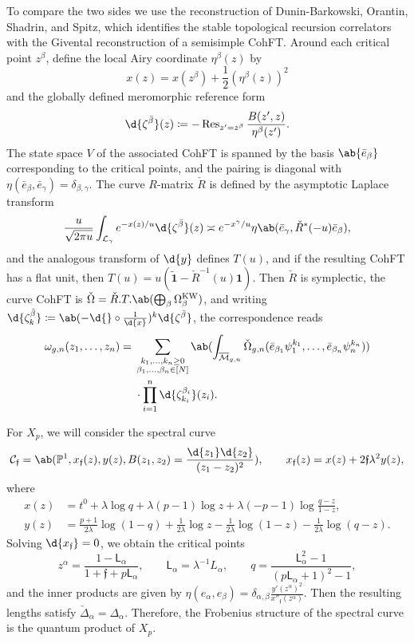 \documentclass{amsart}
\theoremstyle{definition}
\theoremstyle{remark}
\theoremstyle{plain}
\theoremstyle{definition}
\theoremstyle{remark}
\renewcommand{\P}{\mathbb{P}}
\newcommand{\Mbar}{\overline{\mathcal{M}}}
\newcommand{\mc}[1]{\mathcal{#1}}
\newcommand{\mf}[1]{\mathfrak{#1}}
\newcommand{\mr}[1]{\mathrm{#1}}
\newcommand{\on}[1]{\operatorname{#1}}
\newcommand{\ms}[1]{\mathsf{#1}}
\newcommand{\wt}[1]{\widetilde{#1}}
\newcommand{\1}{\mathbf{1}}
\newcommand{\2}{\mathbf{2}}
\newcommand{\3}{\mathbf{3}}
\begin{document}
To compare the two sides we use the reconstruction of Dunin-Barkowski, Orantin, Shadrin, and Spitz, which identifies the stable topological recursion correlators with the Givental reconstruction of a semisimple CohFT. Around each critical point \(z^{\beta}\), define the local Airy coordinate \(\eta^{\beta}(z)\) by
\[ x(z) = x(z^{\beta}) + \frac{1}{2}(\eta^{\beta}(z))^2 \]
and the globally defined meromorphic reference form
\[ \d{\zeta^{\bar{\beta}}}(z) \coloneqq -\on{Res}_{z'=z^{\beta}}\frac{B(z',z)}{\eta^{\beta}(z')}. \]
The state space \(V\) of the associated CohFT is spanned by the basis \(\ab\{\bar{e}_{\beta}\}\) corresponding to the critical points, and the pairing is diagonal with \(\eta(\bar{e}_{\beta},\bar{e}_{\gamma}) = \delta_{\beta,\gamma}\). The curve \(R\)-matrix \(\check{R}\) is defined by the asymptotic Laplace transform
\[ \frac{u}{\sqrt{2\pi u}}\int_{\mc{L}_{\gamma}} e^{-x(z)/u}\d{\zeta^{\bar{\beta}}}(z) \asymp e^{-x^{\gamma}/u}\eta\ab(\bar{e}_{\gamma}, \check{R}^*(-u)\bar{e}_{\beta}), \]
and the analogous transform of \(\d{y}\) defines \(T(u)\), and if the resulting CohFT has a flat unit, then \(T(u) = u(\wt{\1}-\check{R}^{-1}(u)\1)\). Then \(\check{R}\) is symplectic, the curve CohFT is \(\check{\Omega} = \check{R}.T.\ab(\bigoplus_{\beta}\Omega^{\mr{KW}}_{\beta})\), and writing \(\d{\zeta^{\bar{\beta}}_k} \coloneqq \ab(-\d{} \circ \frac{1}{\d{x}})^k \d{\zeta^{\bar{\beta}}}\), the correspondence reads
\begin{align*}
    \omega_{g,n}(z_1,\ldots,z_n) ={}& \sum_{\substack{k_1,\ldots,k_n \geq 0 \\ \beta_1,\ldots,\beta_n \in [N]}}\ab(\int_{\Mbar_{g,n}} \check{\Omega}_{g,n}(\bar{e}_{\beta_1}\psi_1^{k_1},\ldots,\bar{e}_{\beta_n}\psi_n^{k_n})) \\
    &\cdot \prod_{i=1}^n \d{\zeta^{\beta_i}_{k_i}}(z_i).
\end{align*}

For \(X_p\), we will consider the spectral curve
\[ \mc{C}_{\mf{f}} = \ab(\P^1, x_{\mf{f}}(z), y(z), B(z_1,z_2) = \frac{\d{z_1}\d{z_2}}{(z_1-z_2)^2}), \qquad x_{\mf{f}}(z) = x(z) + 2\mf{f}\lambda^2 y(z), \]
where
\begin{align*}
    x(z) &= t^0 + \lambda \log q + \lambda(p-1)\log z + \lambda(-p-1)\log\frac{q-z}{1-z}, \\
    y(z) &= \frac{p+1}{2\lambda}\log(1-q) + \frac{1}{2\lambda}\log z - \frac{1}{2\lambda}\log(1-z) - \frac{1}{2\lambda}\log(q-z).
\end{align*}
Solving \(\d{x_{\mf{f}}} = 0\), we obtain the critical points
\[ z^{\alpha} = \frac{1-\ms{L}_{\alpha}}{1+\mf{f}+p\ms{L}_{\alpha}}, \qquad \ms{L}_{\alpha} = \lambda^{-1}L_{\alpha}, \qquad q = \frac{\ms{L}_{\alpha}^2-1}{(p\ms{L}_{\alpha}+1)^2-1}, \]
and the inner products are given by \(\eta(e_{\alpha},e_{\beta}) = \delta_{\alpha,\beta}\frac{y'(z^{\alpha})^2}{x''_{\mf{f}}(z^{\alpha})}\). Then the resulting lengths satisfy \(\check{\Delta}_{\alpha} = \Delta_{\alpha}\). Therefore, the Frobenius structure of the spectral curve is the quantum product of \(X_p\).
\end{document}
